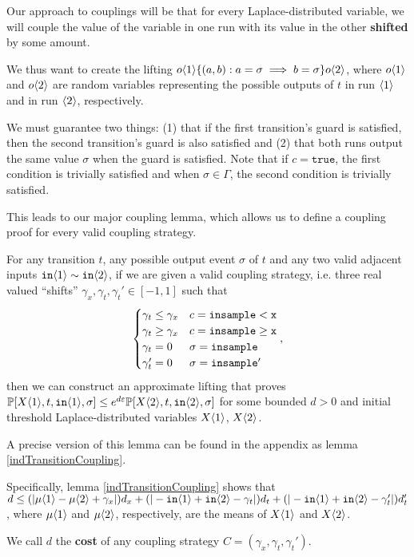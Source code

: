 Our approach to couplings will be that for every Laplace-distributed variable, we will couple the value of the variable in one run with its value in the other \textbf{shifted} by some amount. 

We thus want to create the lifting $o\brangle{1}\{(a, b): a=\sigma\implies b=\sigma\}o\brangle{2}$, where $o\brangle{1}$ and $o\brangle{2}$ are random variables representing the possible outputs of $t$ in run $\brangle{1}$ and in run $\brangle{2}$, respectively.

We must guarantee two things: (1) that if the first transition's guard is satisfied, then the second transition's guard is also satisfied and (2) that both runs output the same value $\sigma$ when the guard is satisfied. Note that if $c = \texttt{true}$, the first condition is trivially satisfied and when $\sigma\in \Gamma$, the second condition is trivially satisfied. 

This leads to our major coupling lemma, which allows us to define a coupling proof for every valid coupling strategy.

\begin{lemma}\label{simplifiedIndTransitionCoupling}
  For any transition $t$, any possible output event $\sigma$ of $t$ and any two valid adjacent inputs $\texttt{in}\brangle{1}\sim \texttt{in}\brangle{2}$, if we are given a valid coupling strategy, i.e. three real valued ``shifts'' $\gamma_x, \gamma_t, \gamma_t'\in [-1, 1]$ such that \[
    \begin{cases}
      \gamma_t\leq\gamma_x & c = \lguard[\texttt{x}]\\
      \gamma_t\geq\gamma_x & c = \gguard[\texttt{x}]\\
      \gamma_t=0 & \sigma = \texttt{insample}\\
      \gamma_t'=0 & \sigma = \texttt{insample}'
    \end{cases},
  \]
  then we can construct an approximate lifting that proves $\PP[X\brangle{1}, t, \texttt{in}\brangle{1}, \sigma]\leq e^{d\varepsilon}\PP[X\brangle{2}, t, \texttt{in}\brangle{2}, \sigma]$ for some bounded $d>0$ and initial threshold Laplace-distributed variables $X\brangle{1}$, $X\brangle{2}$.
\end{lemma}

A precise version of this lemma can be found in the appendix as lemma \ref{indTransitionCoupling}. 

Specifically, lemma \ref{indTransitionCoupling} shows that $d \leq (|\mu\brangle{1}-\mu\brangle{2}+\gamma_x|)d_x+(|-\texttt{in}\brangle{1}+\texttt{in}\brangle{2}-\gamma_t|)d_t+(|-\texttt{in}\brangle{1}+\texttt{in}\brangle{2}-\gamma_t'|)d_t'$, where $\mu\brangle{1}$ and $\mu\brangle{2}$, respectively, are the means of $X\brangle{1}$ and $X\brangle{2}$.

We call $d$ the \textbf{cost} of any coupling strategy $C = (\gamma_x, \gamma_t, \gamma_t')$.
